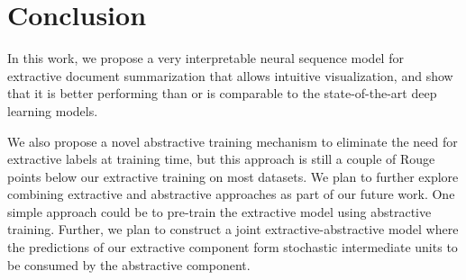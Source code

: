 \documentclass[letterpaper]{article}
\begin{document}
\section{Conclusion}
In this work, we propose a very interpretable neural sequence model for extractive document summarization that allows intuitive visualization, and show that it is better performing than or is comparable to the state-of-the-art deep learning models. 

We also propose a novel abstractive training mechanism to eliminate the need for extractive labels at training time, but this approach is still a couple of Rouge points below our extractive training on most datasets. We plan to further explore combining extractive and abstractive approaches as part of our future work. One simple approach could be to pre-train the extractive model using abstractive training. Further, we plan to construct a joint extractive-abstractive model where the predictions of our extractive component form stochastic intermediate units to be consumed by the abstractive component.
\end{document}
